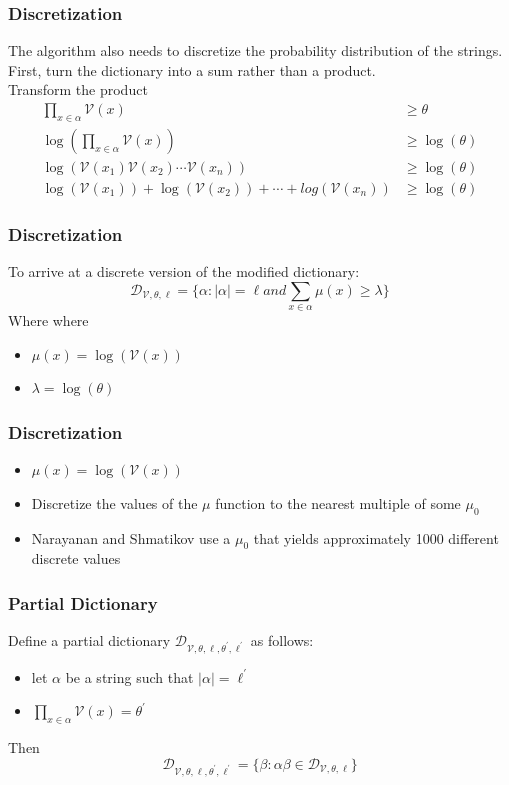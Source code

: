 \documentclass{beamer}
\newenvironment{where}{\noindent{}where\begin{itemize}}{\end{itemize}}
\begin{document}
\begin{frame}
\frametitle{Discretization}
The algorithm also needs to discretize the probability distribution of the strings. First, turn the dictionary into a sum rather than a product. \\
Transform the product
\begin{align*}
\prod_{x \in \alpha}\mathcal{V}(x) & \geq \theta \\
\log(\prod_{x \in \alpha}\mathcal{V}(x)) & \geq \log(\theta) \\
\log(\mathcal{V}(x_1)\mathcal{V}(x_2)\dotsb \mathcal{V}(x_n)) & \geq \log(\theta) \\
\log(\mathcal{V}(x_1)) + \log(\mathcal{V}(x_2)) + \dotsb + log(\mathcal{V}(x_n)) & \geq \log(\theta)
\end{align*}
\end{frame}

\begin{frame}
\frametitle{Discretization}
To arrive at a discrete version of the modified dictionary:
\begin{equation*}
\mathcal{D}_{\mathcal{V},\theta,\ell} = \lbrace \alpha :  \lvert \alpha \rvert = \ell and \sum_{x \in \alpha}\mu(x) \geq \lambda \rbrace
\end{equation*}
Where
\begin{where}
\item $\mu(x) = \log(\mathcal{V}(x))$
\item $\lambda = \log(\theta)$ 
\end{where}
\end{frame}

\begin{frame}
\frametitle{Discretization}
\begin{itemize}
\item $\mu(x) = \log(\mathcal{V}(x))$
\item Discretize the values of the $\mu$ function to the nearest multiple of some $\mu_0$
\item Narayanan and Shmatikov use a $\mu_0$ that yields approximately 1000 different discrete values
\end{itemize}
\end{frame}


\begin{frame}
\frametitle{Partial Dictionary}
Define a partial dictionary $\mathcal{D}_{\mathcal{V},\theta,\ell,\theta^\prime,\ell^\prime}$ as follows:
\begin{itemize}
\item let $\alpha$ be a string such that $\lvert \alpha \rvert = \ell^\prime$
\item $\prod_{x \in \alpha}\mathcal{V}(x)=\theta^\prime$ 
\end{itemize} 
Then
\begin{equation*}
\mathcal{D}_{\mathcal{V},\theta,\ell,\theta^\prime,\ell^\prime} = \lbrace \beta : \alpha \beta \in \mathcal{D}_{\mathcal{V},\theta,\ell} \rbrace
\end{equation*}
\end{frame}
\end{document}

